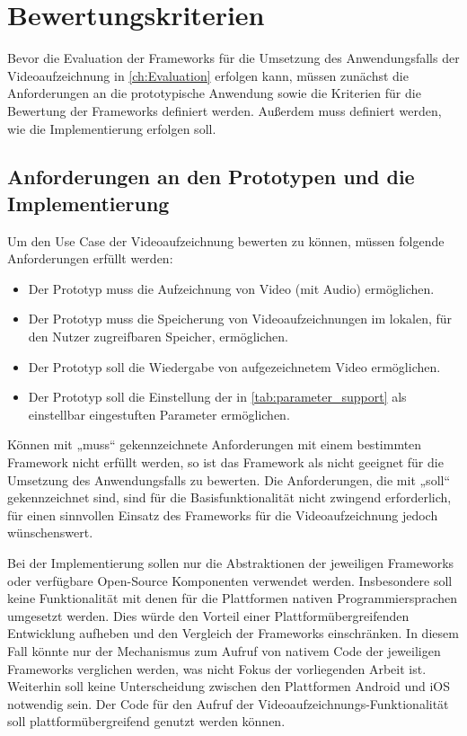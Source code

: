 \chapter{Bewertungskriterien}
\label{ch:Bewertungskriterien}

Bevor die Evaluation der Frameworks für die Umsetzung des Anwendungsfalls der Videoaufzeichnung in \autoref{ch:Evaluation} erfolgen kann, müssen zunächst die Anforderungen an die prototypische Anwendung sowie die Kriterien für die Bewertung der Frameworks definiert werden. 
Außerdem muss definiert werden, wie die Implementierung erfolgen soll.

\section{Anforderungen an den Prototypen und die Implementierung}
\label{sec:anforderungen}
Um den Use Case der Videoaufzeichnung bewerten zu können, müssen folgende Anforderungen erfüllt werden:
\begin{itemize}
  \item Der Prototyp muss die Aufzeichnung von Video (mit Audio) ermöglichen.
  \item Der Prototyp muss die Speicherung von Videoaufzeichnungen im lokalen, für den Nutzer zugreifbaren Speicher, ermöglichen.
  \item Der Prototyp soll die Wiedergabe von aufgezeichnetem Video ermöglichen.
  \item Der Prototyp soll die Einstellung der in \autoref{tab:parameter_support} als einstellbar eingestuften Parameter ermöglichen.
\end{itemize}

Können mit „muss“ gekennzeichnete Anforderungen mit einem bestimmten Framework nicht erfüllt werden, so ist das Framework als nicht geeignet für die Umsetzung des Anwendungsfalls zu bewerten.
Die Anforderungen, die mit „soll“ gekennzeichnet sind, sind für die Basisfunktionalität nicht zwingend erforderlich, für einen sinnvollen Einsatz des Frameworks für die Videoaufzeichnung jedoch wünschenswert.

Bei der Implementierung sollen nur die Abstraktionen der jeweiligen Frameworks oder verfügbare Open-Source Komponenten verwendet werden.
Insbesondere soll keine Funktionalität mit denen für die Plattformen nativen Programmiersprachen umgesetzt werden.
Dies würde den Vorteil einer Plattformübergreifenden Entwicklung aufheben und den Vergleich der Frameworks einschränken.
In diesem Fall könnte nur der Mechanismus zum Aufruf von nativem Code der jeweiligen Frameworks verglichen werden, was nicht Fokus der vorliegenden Arbeit ist.
Weiterhin soll keine Unterscheidung zwischen den Plattformen Android und iOS notwendig sein.
Der Code für den Aufruf der Videoaufzeichnungs-Funktionalität soll plattformübergreifend genutzt werden können.


